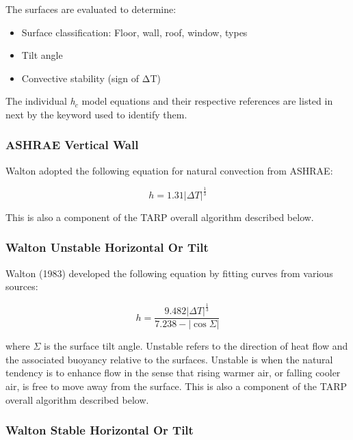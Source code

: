 The surfaces are evaluated to determine:

\begin{itemize}
\item
  Surface classification: Floor, wall, roof, window, types
\item
  Tilt angle
\item
  Convective stability (sign of ΔT)
\end{itemize}

The individual \emph{h\(_{c}\)} model equations and their respective references are listed in next by the keyword used to identify them.

\subsubsection{ASHRAE Vertical Wall}\label{ashrae-vertical-wall}

Walton adopted the following equation for natural convection from ASHRAE:

\begin{equation}
h = 1.31{\left| {\Delta T} \right|^{\frac{1}{3}}}
\end{equation}

This is also a component of the TARP overall algorithm described below.

\subsubsection{Walton Unstable Horizontal Or Tilt}\label{walton-unstable-horizontal-or-tilt}

Walton (1983) developed the following equation by fitting curves from various sources:

\begin{equation}
h = \frac{{9.482{{\left| {\Delta T} \right|}^{\frac{1}{3}}}}}{{7.238 - \left| {\cos \Sigma } \right|}}
\end{equation}

where $\Sigma$ is the surface tilt angle. Unstable refers to the direction of heat flow and the associated buoyancy relative to the surfaces. Unstable is when the natural tendency is to enhance flow in the sense that rising warmer air, or falling cooler air, is free to move away from the surface. This is also a component of the TARP overall algorithm described below.

\subsubsection{Walton Stable Horizontal Or Tilt}\label{walton-stable-horizontal-or-tilt}

